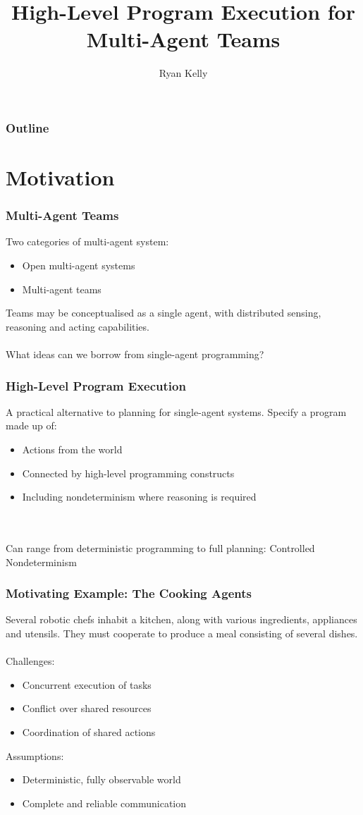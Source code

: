 \documentclass{beamer}
\title{High-Level Program Execution for Multi-Agent Teams}
\author{Ryan Kelly}
\begin{document}
\begin{frame}
  \titlepage
\end{frame}

\begin{frame}
  \frametitle{Outline}
  \tableofcontents
\end{frame}

\section{Motivation}

\begin{frame}
\frametitle{Multi-Agent Teams}
Two categories of multi-agent system:
\begin{itemize}
  \item Open multi-agent systems
  \item Multi-agent teams
\end{itemize}
Teams may be conceptualised as a single agent, with distributed sensing,
reasoning and acting capabilities.\\
\ \\
\pause
What ideas can we borrow from single-agent programming?
\end{frame}

\begin{frame}
\frametitle{High-Level Program Execution}
A practical alternative to planning for single-agent systems. Specify
a program made up of:
\begin{itemize}
  \item Actions from the world
  \item Connected by high-level programming constructs
  \item Including nondeterminism where reasoning is required
\end{itemize}
\ \\
\ \\
Can range from deterministic programming to full planning:
\alert{Controlled Nondeterminism}
\end{frame}

\begin{frame}
\frametitle{Motivating Example: The Cooking Agents}
Several robotic chefs inhabit a kitchen, along with various ingredients,
appliances and utensils.  They must cooperate to produce a meal consisting
of several dishes.\\
\ \\
Challenges:
\begin{itemize}
  \item Concurrent execution of tasks
  \item Conflict over shared resources
  \item Coordination of shared actions
\end{itemize}

Assumptions:
\begin{itemize}
  \item Deterministic, fully observable world
  \item Complete and reliable communication
\end{itemize}
\end{frame}
\end{document}
